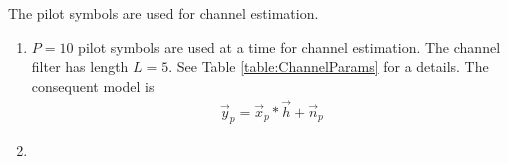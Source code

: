 The pilot symbols are used for channel estimation.
\begin{enumerate}[label=\thesubsection.\arabic*.,ref=\thesubsection.\theenumi]


\item $P=10$ pilot symbols are used at a time for channel estimation.  The channel filter has length $L=5$.  See Table \ref{table:ChannelParams} for a details.
The consequent model is
\begin{align}
\vec{y}_p = \vec{x}_p*\vec{h}+ \vec{n}_p
\end{align}
\begin{table}[!h]
\centering

\caption{}
\label{table:ChannelParams}
\end{table}
\item 
\end{enumerate}
